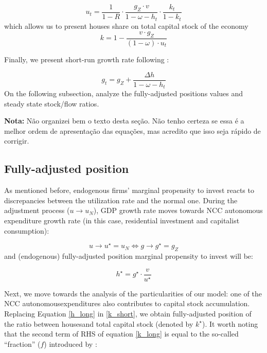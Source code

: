 \documentclass[11pt]{article}
\begin{document}
\begin{equation}
\label{u_houses}
u_{t} = \frac{1}{1-R}\cdot \frac{g_Z\cdot v}{1 - \omega - h_{t}}\cdot \frac{k_{t}}{1-k_{t}}
\end{equation}
which allows us to present houses share on total capital stock of the economy
\begin{equation}
\label{k_short}
k = 1 - \frac{v\cdot g_Z}{(1 - \omega)\cdot u_{t}}
\end{equation}


Finally, we present short-run growth rate following \textcite{freitas_growth_2015}:

\begin{equation}
\label{g_short}
g_t = g_{Z} + \frac{\Delta h}{1 - \omega - h_{t}}
\end{equation}
On the following subsection, analyze the fully-adjusted positions values and steady state stock/flow ratios.


\textbf{Nota:} Não organizei bem o texto desta seção. Não tenho certeza se essa é a melhor ordem de apresentação das equações, mas acredito que isso seja rápido de corrigir.

\subsection{Fully-adjusted position}
\label{sec:orgd135636}
\label{long}


As mentioned before, endogenous firms’ marginal propensity to invest reacts to discrepancies between the utilization rate and the normal one.  During the adjustment process (\(u\to u_N\)), GDP growth rate moves towards NCC autonomous expenditure growth rate (in this case, residential investment and capitalist consumption):

$$
u \to u^{\star}  = u_N \Leftrightarrow g \to g^{\star} = g_Z
$$
and (endogenous) fully-adjusted position marginal propensity to invest will be:


\begin{equation}
\label{h_long}
h^{\star} = g^{\star}\cdot \frac{v}{u^{\star}}
\end{equation}

Next, we move towards the analysis of the particularities of our model:  one of the NCC autonomousexpenditures also contributes to capital stock accumulation.  
Replacing Equation \ref{h_long} in \ref{k_short}, we obtain fully-adjusted position of the ratio between housesand total capital stock (denoted by \(k^\star\)). It worth noting that the second term of RHS of equation \ref{k_long} is equal to the so-called ``fraction'' (\(f\)) introduced by \textcite{serrano_long_1995}:
\end{document}
